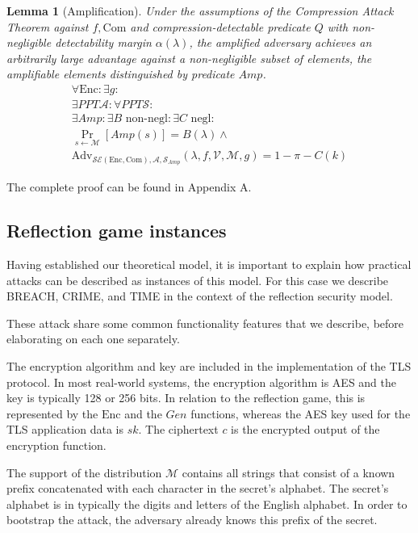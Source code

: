 \documentclass[conference, letterpaper, 10pt]{IEEEtran}
\newtheorem{lemma}{Lemma}
\begin{document}
\begin{lemma}[Amplification]

Under the assumptions of the Compression Attack Theorem against $f, \textrm{Com}$
and compression-detectable predicate $Q$ with non-negligible
detectability margin $\alpha(\lambda)$,
the amplified adversary achieves an arbitrarily large advantage
against a non-negligible subset of elements, the
\textit{amplifiable elements} distinguished by predicate $Amp$.
\begin{align*}
    \forall \textrm{Enc}:
    \exists g:\\
    \exists PPT \mathcal{A}:
    \forall PPT \mathcal{S}:\\
    \exists Amp:
    \exists B \text{ non-negl}:
    \exists C \text{ negl}:\\
    \Pr_{s \leftarrow \mathcal{M}}[Amp(s)] = B(\lambda) \land\\
    \text{Adv}_{\mathcal{SE}(\textrm{Enc}, \textrm{Com}), \mathcal{A}, \mathcal{S}_{Amp}}
    (\lambda, f, \mathcal{V}, \mathcal{M}, g) = 1 - \pi - C(k)
\end{align*}

\end{lemma}

The complete proof can be found in Appendix A.

\subsection{Reflection game instances}
Having established our theoretical model, it is important to explain how
practical attacks can be described as instances of this model. For this case we
describe BREACH, CRIME, and TIME in the context of the reflection security model.

These attack share some common functionality features that we describe, before
elaborating on each one separately.

The encryption algorithm and key are included in the implementation of the TLS
protocol. In most real-world systems, the encryption algorithm is AES and the
key is typically 128 or 256 bits. In relation to the reflection game, this is
represented by the $\textrm{Enc}$ and the $Gen$ functions, whereas the AES
key used for the TLS application data is $sk$. The ciphertext $c$ is the
encrypted output of the encryption function.

The support of the distribution $\mathcal{M}$ contains all strings that consist
of a known prefix concatenated with each character in the secret's alphabet. The
secret's alphabet is in typically the digits and letters of the English alphabet.
In order to bootstrap the attack, the adversary already knows this prefix of the
secret.
\end{document}
